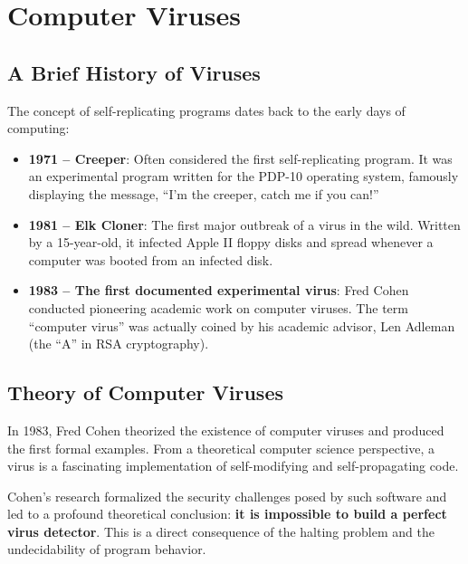 \section{Computer Viruses}

\subsection{A Brief History of Viruses}
The concept of self-replicating programs dates back to the early days of computing:
\begin{itemize}
    \item \textbf{1971 -- Creeper}: Often considered the first self-replicating program. It was an experimental program written for the PDP-10 operating system, famously displaying the message, ``I'm the creeper, catch me if you can!''
    \item \textbf{1981 -- Elk Cloner}: The first major outbreak of a virus in the wild. Written by a 15-year-old, it infected Apple II floppy disks and spread whenever a computer was booted from an infected disk.
    \item \textbf{1983 -- The first documented experimental virus}: Fred Cohen conducted pioneering academic work on computer viruses. The term ``computer virus'' was actually coined by his academic advisor, Len Adleman (the ``A'' in RSA cryptography).
\end{itemize}

\subsection{Theory of Computer Viruses}
In 1983, Fred Cohen theorized the existence of computer viruses and produced the first formal examples. From a theoretical computer science perspective, a virus is a fascinating implementation of self-modifying and self-propagating code.

Cohen's research formalized the security challenges posed by such software and led to a profound theoretical conclusion: \textbf{it is impossible to build a perfect virus detector}. This is a direct consequence of the halting problem and the undecidability of program behavior.

